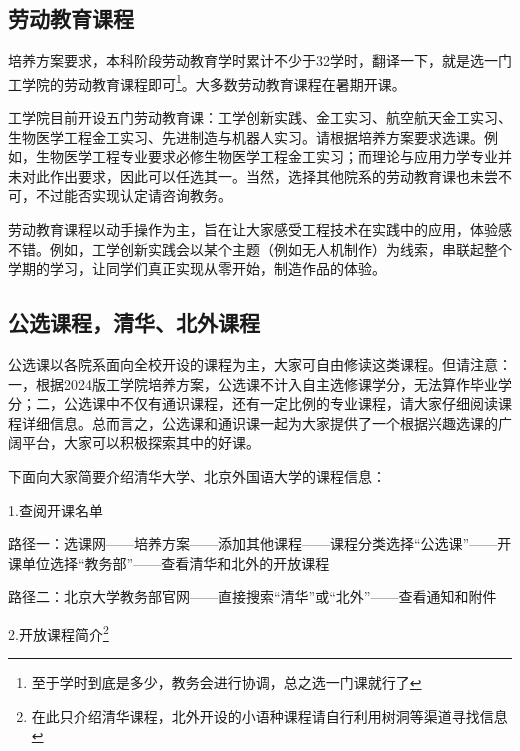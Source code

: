 \documentclass[11pt,oneside]{book}
\begin{document}
\subsection{劳动教育课程}
培养方案要求，本科阶段劳动教育学时累计不少于32学时，翻译一下，就是选一门工学院的劳动教育课程即可\footnote{至于学时到底是多少，教务会进行协调，总之选一门课就行了}。大多数劳动教育课程在暑期开课。

\vspace{10pt}

工学院目前开设五门劳动教育课：工学创新实践、金工实习、航空航天金工实习、生物医学工程金工实习、先进制造与机器人实习。请根据培养方案要求选课。例如，生物医学工程专业要求必修生物医学工程金工实习；而理论与应用力学专业并未对此作出要求，因此可以任选其一。当然，选择其他院系的劳动教育课也未尝不可，不过能否实现认定请咨询教务。

\vspace{10pt}

劳动教育课程以动手操作为主，旨在让大家感受工程技术在实践中的应用，体验感不错。例如，工学创新实践会以某个主题（例如无人机制作）为线索，串联起整个学期的学习，让同学们真正实现从零开始，制造作品的体验。

\subsection{公选课程，清华、北外课程}
公选课以各院系面向全校开设的课程为主，大家可自由修读这类课程。但请注意：一，根据2024版工学院培养方案，公选课不计入自主选修课学分，无法算作毕业学分；二，公选课中不仅有通识课程，还有一定比例的专业课程，请大家仔细阅读课程详细信息。总而言之，公选课和通识课一起为大家提供了一个根据兴趣选课的广阔平台，大家可以积极探索其中的好课。

\vspace{10pt}

下面向大家简要介绍清华大学、北京外国语大学的课程信息：

\vspace{10pt}

1.查阅开课名单

路径一：选课网——培养方案——添加其他课程——课程分类选择“公选课”——开课单位选择“教务部”——查看清华和北外的开放课程

路径二：北京大学教务部官网——直接搜索“清华”或“北外”——查看通知和附件

\vspace{10pt}

2.开放课程简介\footnote{在此只介绍清华课程，北外开设的小语种课程请自行利用树洞等渠道寻找信息}
\end{document}

